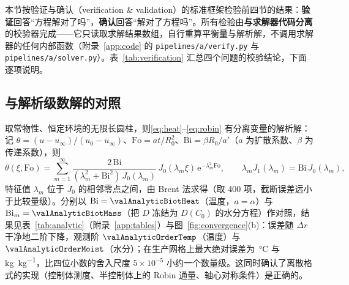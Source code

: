 本节按验证与确认（verification \& validation）的标准框架\cite{roache1998,oberkampf2010}检验前四节的结果：\textbf{验证}回答“方程解对了吗”，\textbf{确认}回答“解对了方程吗”。所有检验由\textbf{与求解器代码分离}的校验器完成——它只读取求解结果数组，自行重算平衡量与解析解，不调用求解器的任何内部函数（附录~\ref{app:code} 的 \nolinkurl{pipelines/a/verify.py} 与 \nolinkurl{pipelines/a/solver.py}）。表~\ref{tab:verification} 汇总四个问题的校验结论，下面逐项说明。



\subsection{与解析级数解的对照}
\label{subsec:analytic}

取常物性、恒定环境的无限长圆柱，则\eqref{eq:heat}--\eqref{eq:robin} 有分离变量的解析解：记 $\theta=(u-u_\infty)/(u_0-u_\infty)$、$\mathrm{Fo}=at/R_0^2$、$\mathrm{Bi}=\beta R_0/a'$（$a$ 为扩散系数、$\beta$ 为传递系数），则
\begin{equation}
\theta(\xi,\mathrm{Fo})=\sum_{m=1}^{\infty}\frac{2\,\mathrm{Bi}}{(\lambda_m^2+\mathrm{Bi}^2)\,J_0(\lambda_m)}\,J_0(\lambda_m\xi)\,\mathrm{e}^{-\lambda_m^2\mathrm{Fo}},
\qquad \lambda_m J_1(\lambda_m)=\mathrm{Bi}\,J_0(\lambda_m),
\label{eq:bessel}
\end{equation}
特征值 $\lambda_m$ 位于 $J_0$ 的相邻零点之间，由 Brent 法求得（取 400 项，截断误差远小于比较量级）\cite{carslaw1959,crank1975}。分别以 $\mathrm{Bi}=\valAnalyticBiotHeat$（温度，$a=\alpha$）与 $\mathrm{Bi}_m=\valAnalyticBiotMass$（把 $D$ 冻结为 $D(C_0)$ 的水分方程）作对照，结果见表~\ref{tab:analytic}（附录~\ref{app:tables}）与图~\ref{fig:convergence}(b)：误差随 $\Delta r$ 干净地二阶下降，观测阶 $\valAnalyticOrderTemp$（温度）与 $\valAnalyticOrderMoist$（水分）；在生产网格上最大绝对误差为 \sci{\valAnalyticErrTemp}\,\si{\celsius} 与 \sci{\valAnalyticErrMoist} \si{\kilo\gram\per\kilo\gram}，比四位小数的舍入尺度 $5\times10^{-5}$ 小约一个数量级。这同时确认了离散格式的实现（控制体测度、半控制体上的 Robin 通量、轴心对称条件）是正确的。

